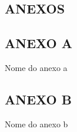 \begin{center}
    \section*{ANEXOS}
\end{center}

\newpage
{}
\begin{center}
    \section*{ANEXO A}
    Nome do anexo a
\end{center}



\newpage
{}
\begin{center}
    \section*{ANEXO B}
    Nome do anexo b
\end{center}

